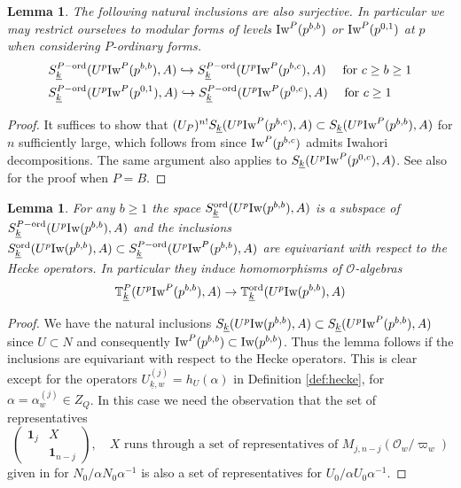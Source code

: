 \documentclass[leqno]{amsart}
\newtheorem{lem}[thm]{Lemma}
\theoremstyle{definition}
\theoremstyle{remark}
\newcommand{\id}{\mathbf{1}}
\newcommand{\oo}{\mathcal{O}}
\newcommand{\wt}[1]{\underline{ #1 }}
\newcommand{\Iw}{\textnormal{Iw}} %
\newcommand{\TT}{\mathbb{T}} %
\newcommand{\ord}{\textnormal{ord}} %
\begin{document}
\begin{lem}\label{lem:control}
	The following natural inclusions are also surjective.
    In particular we may restrict ourselves 
    to modular forms of levels $\Iw^P(p^{b,b})$ or $\Iw^P(p^{0,1})$
    at $p$ when considering $P$-ordinary forms.
	\begin{align*}
	&S_{\wt{k}}^{P-\ord}(U^p\Iw^P(p^{b,b}),A)\hookrightarrow	
	S_{\wt{k}}^{P-\ord}(U^p\Iw^P(p^{b,c}),A)\quad 
	\text{ for } c\geq b\geq 1\\
	&S_{\wt{k}}^{P-\ord}(U^p\Iw^P(p^{0,1}),A)\hookrightarrow	
	S_{\wt{k}}^{P-\ord}(U^p\Iw^P(p^{0,c}),A)\quad \text{ for } c\geq 1
	\end{align*}
\end{lem}
\begin{proof}
	It suffices to show that 
	$(U_P)^{n!}S_{\wt{k}}(U^p\Iw^P(p^{b,c}),A)
	\subset S_{\wt{k}}(U^p\Iw^P(p^{b,b}),A)$
	for $n$ sufficiently large, 
	which follows from \cite[Lem 3.3.2]{emeI}
	since $\Iw^P(p^{b,c})$ admits Iwahori decompositions.
	The same argument also applies to 
	$S_{\wt{k}}(U^p\Iw^P(p^{0,c}),A)$.
	See also \cite[Lem 2.19]{ger} for the proof when $P=B$.
\end{proof}

\begin{lem}\label{lem:PtoB}
	For any $b\geq 1$
    the space $S_{\wt{k}}^{\ord}(U^p\Iw(p^{b,b}),A)$
    is a subspace of 
    $S_{\wt{k}}^{P-\ord}(U^p\Iw(p^{b,b}),A)$
	  and the inclusions
	$S_{\wt{k}}^{\ord}(U^p\Iw(p^{b,b}),A)\subset
	S_{\wt{k}}^{P-\ord}(U^p\Iw^P(p^{b,b}),A)$
    are equivariant with respect to the Hecke operators.
    In particular they induce homomorphisms of $\oo$-algebras
	\[
		\TT^P_{\wt{k}}(U^p\Iw^P(p^{b,b}),A)\to
		\TT^{\ord}_{\wt{k}}(U^p\Iw(p^{b,b}),A)
	\]
\end{lem}
\begin{proof}
	We have the natural inclusions
	$S_{\wt{k}}(U^p\Iw(p^{b,b}),A)\subset 
	S_{\wt{k}}(U^p\Iw^P(p^{b,b}),A)$
	since $U\subset N$ and consequently 
    $\Iw^P(p^{b,b})\subset \Iw(p^{b,b})$.
    Thus the lemma follows if the inclusions
	are equivariant with respect to the Hecke operators.
	This is clear except for the operators 
    $U_{\wt{k},w}^{(j)}=h_U(\alpha)$
    in Definition \ref{def:hecke},
    for $\alpha=\alpha_w^{(j)}\in Z_Q$.
    In this case we need the observation that
    the set of representatives
	\[
	\begin{pmatrix}
		\id_j&X\\&\id_{n-j}
	\end{pmatrix},\quad
	X \text{ runs through a set of representatives of }
	M_{j,n-j}(\oo_w/\varpi_w)
	\]
    given in \cite[Lem 2.10]{ger} for $N_0/\alpha N_0\alpha^{-1}$
	is also a set of representatives for 
	$U_0/\alpha U_0\alpha^{-1}$.
\end{proof}
\end{document}
